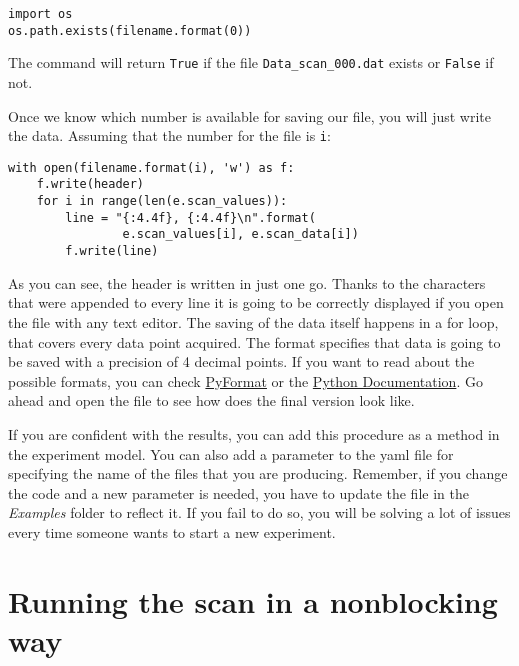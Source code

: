 \begin{verbatim}
import os
os.path.exists(filename.format(0))
\end{verbatim}

The command will return \texttt{True} if the file \texttt{Data_scan_000.dat} exists or \texttt{False} if not.


Once we know which number is available for saving our file, you will just write the data. Assuming that the number for the file is
\texttt{i}:

\begin{verbatim}
with open(filename.format(i), 'w') as f:
    f.write(header)
    for i in range(len(e.scan_values)):
        line = "{:4.4f}, {:4.4f}\n".format(
                e.scan_values[i], e.scan_data[i])
        f.write(line)
\end{verbatim}

As you can see, the header is written in just one go. Thanks to the \texttt{\n} characters that were appended to every line it is going to be correctly displayed if you open the file with any text editor. The saving of the data itself happens in a for loop, that covers every data point acquired. The format specifies that data is going to be saved with a precision of 4 decimal points. If you want to read about the possible formats, you can check \href{https://pyformat.info/}{PyFormat} or the \href{https://docs.python.org/3.6/library/stdtypes.html\#str.format}{Python Documentation}. Go ahead and open the file to see how does the final version look like.


If you are confident with the results, you can add this procedure as a method in the experiment model. You can also add a parameter to the yaml file for specifying the name of the files that you are producing. Remember, if you change the code and a new parameter is needed, you have to update the file in the \emph{Examples} folder to reflect it. If you fail to do so, you will be solving a lot of issues every time someone wants to start a new experiment.

\section{Running the scan in a nonblocking way}\label{running-the-scan-in-a-nonblockingway}

